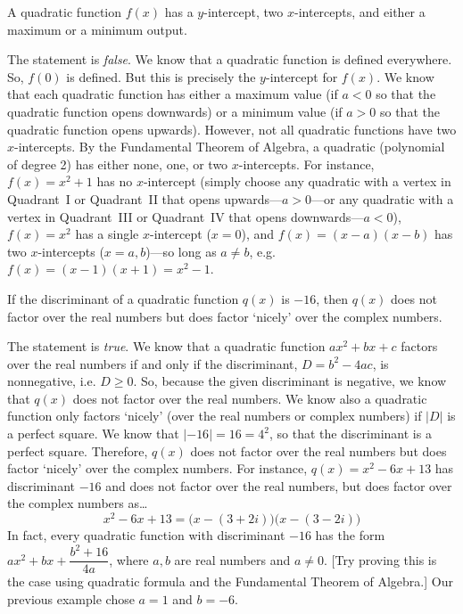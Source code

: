 \documentclass[11pt,letterpaper]{article}
\begin{document}
 A quadratic function $f(x)$ has a $y$-intercept, two $x$-intercepts, and either a maximum or a minimum output. \pspace

\sol The statement is \textit{false}. We know that a quadratic function is defined everywhere. So, $f(0)$ is defined. But this is precisely the $y$-intercept for $f(x)$. We know that each quadratic function has either a maximum value (if $a < 0$ so that the quadratic function opens downwards) or a minimum value (if $a > 0$ so that the quadratic function opens upwards). However, not all quadratic functions have two $x$-intercepts. By the Fundamental Theorem of Algebra, a quadratic (polynomial of degree 2) has either none, one, or two $x$-intercepts. For instance, $f(x)= x^2 + 1$ has no $x$-intercept (simply choose any quadratic with a vertex in Quadrant~I or Quadrant~II that opens upwards---$a>0$---or any quadratic with a vertex in Quadrant~III or Quadrant~IV that opens downwards---$a<0$), $f(x)= x^2$ has a single $x$-intercept ($x= 0$), and $f(x)= (x - a)(x - b)$ has two $x$-intercepts ($x= a, b$)---so long as $a \neq b$, e.g. $f(x)= (x - 1)(x + 1)= x^2 - 1$. \par\vspace{1.3cm} 



 If the discriminant of a quadratic function $q(x)$ is $-16$, then $q(x)$ does not factor over the real numbers but does factor `nicely' over the complex numbers. \pspace

\sol The statement is \textit{true}. We know that a quadratic function $ax^2 + bx + c$ factors over the real numbers if and only if the discriminant, $D= b^2 - 4ac$, is nonnegative, i.e. $D \geq 0$. So, because the given discriminant is negative, we know that $q(x)$ does not factor over the real numbers. We know also a quadratic function only factors `nicely' (over the real numbers or complex numbers) if $|D|$ is a perfect square. We know that $|-16|= 16= 4^2$, so that the discriminant is a perfect square. Therefore, $q(x)$ does not factor over the real numbers but does factor `nicely' over the complex numbers. For instance, $q(x)= x^2 - 6x + 13$ has discriminant $-16$ and does not factor over the real numbers, but does factor over the complex numbers as\dots
	\[
	x^2 - 6x + 13= \big(x - (3 + 2i) \big) \big(x - (3 - 2i) \big)
	\]
In fact, every quadratic function with discriminant $-16$ has the form $ax^2 + bx + \dfrac{b^2 + 16}{4a}$, where $a, b$ are real numbers and $a \neq 0$. [Try proving this is the case using quadratic formula and the Fundamental Theorem of Algebra.] Our previous example chose $a= 1$ and $b= -6$. \par\vspace{1.3cm}
\end{document}
